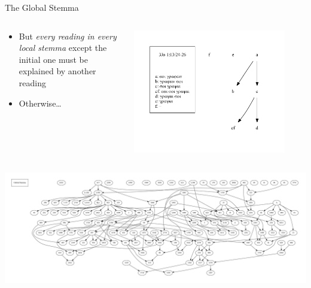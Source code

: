 \documentclass[10pt]{beamer}
\begin{document}
	\begin{frame}{The Global Stemma}
		\begin{columns}
			\begin{column}{0.45\textwidth}
				\begin{itemize}
					\item But \emph{every reading in every local stemma} except the initial one must be explained by another reading
					\item Otherwise…
				\end{itemize}
			\end{column}
			\begin{column}{0.45\textwidth}
				\begin{center}
					\includegraphics[width=0.875\textwidth]{../graphics/B25K1V13U24-26-local-stemma-incomplete.pdf}
				\end{center}	
			\end{column}
		\end{columns}
		\begin{center}
			\includegraphics[width=\textwidth]{../graphics/global-stemma-incomplete.pdf}
		\end{center}	
	\end{frame}
\end{document}
